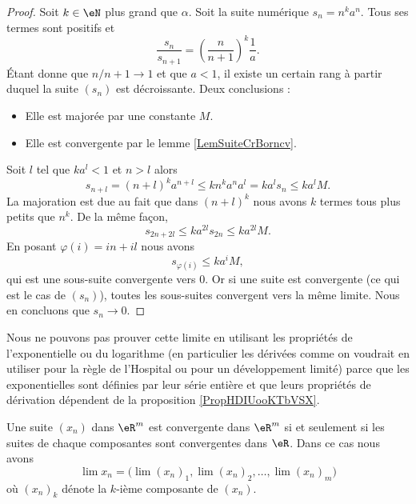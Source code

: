 \begin{proof}
    Soit \( k\in \eN\) plus grand que \( \alpha\).
    Soit la suite numérique \( s_n=n^ka^n\). Tous ses termes sont positifs et
    \begin{equation}
        \frac{ s_n }{ s_{n+1} }=\left( \frac{ n }{ n+1 } \right)^k\frac{1}{ a }.
    \end{equation}
    Étant donne que \( n/n+1\to 1\) et que \( a<1\), il existe un certain rang à partir duquel la suite \( (s_n)\) est décroissante. Deux conclusions :
    \begin{itemize}
        \item Elle est majorée par une constante \( M\).
        \item Elle est convergente par le lemme \ref{LemSuiteCrBorncv}.
    \end{itemize}
    Soit \( l\) tel que \( ka^l<1\) et \( n>l\) alors
    \begin{equation}
        s_{n+l}=(n+l)^ka^{n+l}\leq kn^ka^na^l=ka^ls_n\leq ka^lM.
    \end{equation}
    La majoration est due au fait que dans \( (n+l)^k\) nous avons \( k\) termes tous plus petits que \( n^k\). De la même façon,
    \begin{equation}
        s_{2n+2l}\leq ka^{2l}s_{2n}\leq ka^{2l}M.
    \end{equation}
    En posant \( \varphi(i)=in+il\) nous avons
    \begin{equation}
        s_{\varphi(i)}\leq ka^iM,
    \end{equation}
    qui est une sous-suite convergente vers \( 0\). Or si une suite est convergente (ce qui est le cas de \( (s_n)\)), toutes les sous-suites convergent vers la même limite. Nous en concluons que \( s_n\to 0\).
\end{proof}

\begin{remark}
    Nous ne pouvons pas prouver cette limite en utilisant les propriétés de l'exponentielle ou du logarithme (en particulier les dérivées comme on voudrait en utiliser pour la règle de l'Hospital ou pour un développement limité) parce que les exponentielles sont définies par leur série entière et que leurs propriétés de dérivation dépendent de la proposition \ref{PropHDIUooKTbVSX}.
\end{remark}

\begin{proposition}		\label{PropCvRpComposante}
	Une suite $(x_n)$ dans $\eR^m$ est convergente dans $\eR^m$ si et seulement si les suites de chaque composantes sont convergentes dans $\eR$. Dans ce cas nous avons
	 \begin{equation}
		 \lim x_n=\Big( \lim(x_n)_1,\lim (x_n)_2,\ldots,\lim (x_n)_m \Big)
	 \end{equation}
	 où $(x_n)_k$ dénote la $k$-ième composante de $(x_n)$.
\end{proposition}


